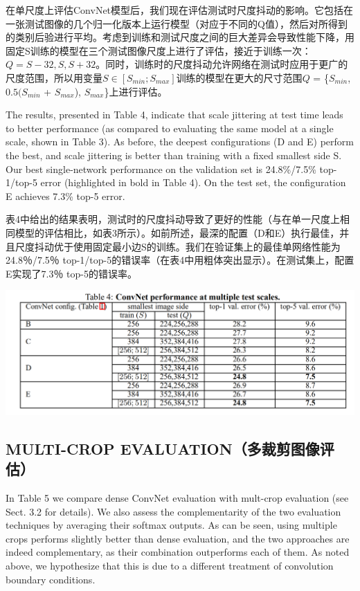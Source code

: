 \documentclass[12pt,a4paper,UTF8,twoside]{book}
\begin{document}
在单尺度上评估ConvNet模型后，我们现在评估测试时尺度抖动的影响。它包括在一张测试图像的几个归一化版本上运行模型（对应于不同的Q值），然后对所得到的类别后验进行平均。考虑到训练和测试尺度之间的巨大差异会导致性能下降，用固定S训练的模型在三个测试图像尺度上进行了评估，接近于训练一次：\(Q = {S − 32, S, S + 32}\)。同时，训练时的尺度抖动允许网络在测试时应用于更广的尺度范围，所以用变量\(S \in [S_{min}; S_{max}]\)训练的模型在更大的尺寸范围\(Q\) = \{\(S_{min}\), \(0.5(S_{min}\) + \(S_{max}\)), \(S_{max}\)\}上进行评估。

The results, presented in Table 4, indicate that scale jittering at test time leads to better performance (as compared to evaluating the same model at a single scale, shown in Table 3). As before, the deepest configurations (D and E) perform the best, and scale jittering is better than training with a fixed smallest side S. Our best single-network performance on the validation set is 24.8\%/7.5\% top-1/top-5 error (highlighted in bold in Table 4). On the test set, the configuration E achieves 7.3\% top-5 error.

表4中给出的结果表明，测试时的尺度抖动导致了更好的性能（与在单一尺度上相同模型的评估相比，如表3所示）。如前所述，最深的配置（D和E）执行最佳，并且尺度抖动优于使用固定最小边S的训练。我们在验证集上的最佳单网络性能为24.8％/7.5％ top-1/top-5的错误率（在表4中用粗体突出显示）。在测试集上，配置E实现了7.3％ top-5的错误率。

\begin{center}\includegraphics[width=0.7\linewidth]{img/03-04} \end{center}

\hypertarget{multi-crop-evaluationux591aux88c1ux526aux56feux50cfux8bc4ux4f30}{%
\subsection{MULTI-CROP EVALUATION（多裁剪图像评估）}\label{multi-crop-evaluationux591aux88c1ux526aux56feux50cfux8bc4ux4f30}}

In Table 5 we compare dense ConvNet evaluation with mult-crop evaluation (see Sect. 3.2 for details). We also assess the complementarity of the two evaluation techniques by averaging their softmax outputs. As can be seen, using multiple crops performs slightly better than dense evaluation, and the two approaches are indeed complementary, as their combination outperforms each of them. As noted above, we hypothesize that this is due to a different treatment of convolution boundary conditions.
\end{document}
